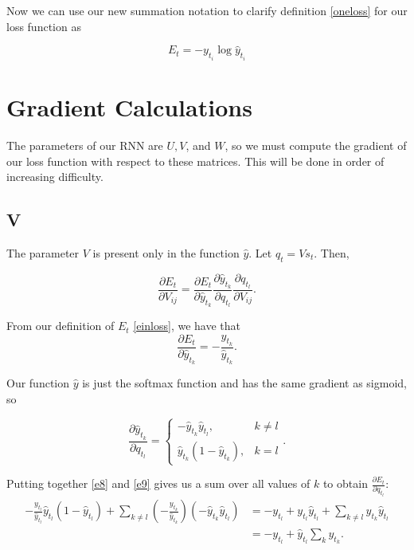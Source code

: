 \documentclass[11pt,twoside]{article}
\begin{document}
\noindent Now we can use our new summation notation to clarify definition \eqref{oneloss} for our loss function as

\begin{equation}
\label{einloss}
E_t=-y_{t_i}\log{\hat{y}_{t_i}}
\end{equation}

\section{Gradient Calculations}
The parameters of our RNN are $U, V$, and $W$, so we must compute the gradient of our loss function with respect to these matrices. This will be done in order of increasing difficulty.

\subsection{V}
The parameter $V$ is present only in the function $\hat{y}$. Let $q_t=V s_t$. Then,

\begin{equation}
\frac{\partial E_t}{\partial V_{i j}}=\frac{\partial E_t}{\partial \hat{y}_{t_k}}\frac{\partial \hat{y}_{t_k}}{\partial q_{t_l}}\frac{\partial q_{t_l}}{\partial  V_{i j}}.
\end{equation}

\noindent From our definition of $E_t$ \eqref{einloss}, we have that 
\begin{equation}
\label{e8}
\frac{\partial E_t}{\partial \hat{y}_{t_k}}=-\frac{y_{t_k}}{\hat{y}_{t_k}}.
\end{equation}

\noindent Our function $\hat{y}$ is just the softmax function and has the same gradient as sigmoid, so

\begin{equation}
\label{e9}
\frac{\partial \hat{y}_{t_k}}{\partial q_{t_l}}=\left\{
	\begin{array}{lr}
	-\hat{y}_{t_k}\hat{y}_{t_l}, & k\neq l \\
	\hat{y}_{t_k}\left(1-\hat{y}_{t_k}\right), & k=l
	\end{array}
	\right..
\end{equation}


\noindent Putting together \eqref{e8} and \eqref{e9} gives us a sum over all values of $k$ to obtain $\frac{\partial E_t}{\partial q_{t_l}}$:
\begin{subequations}
\begin{align}
-\frac{y_{t_l}}{\hat{y}_{t_l}}\hat{y}_{t_l}\left(1-\hat{y}_{t_l}\right)+\sum_{k\ne l}{}\left(-\frac{y_{t_k}}{\hat{y}_{t_k}}\right)\left(-\hat{y}_{t_k}\hat{y}_{t_l}\right) 
&= -y_{t_l}+y_{t_l}\hat{y}_{t_l}+\sum_{k\ne l}{}y_{t_k}\hat{y}_{t_l} \\
&= -y_{t_l} + \hat{y}_{t_l}\sum_{k}{}y_{t_k}.
\end{align}
\end{subequations}
\end{document}
